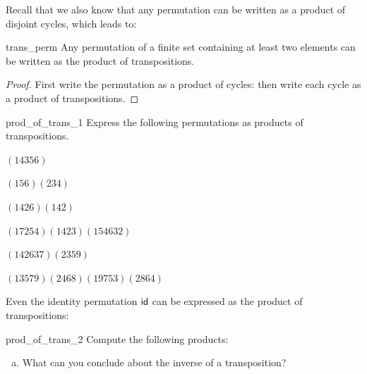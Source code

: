 \noindent
Recall that we also know that any permutation can be written as a product of disjoint cycles, which leads to:

\begin{prop}{trans_perm}
Any permutation of a finite set containing at least two elements can
be written as the product of transpositions. 
\end{prop}

\begin{proof} First write the permutation as a product of cycles: then write each cycle as a product of transpositions.
\end{proof}

\begin{exercise}{prod_of_trans_1}
Express the following permutations as products of transpositions. 

\begin{enumerate}[(a)]
\begin{multicols}{2}
 \item
$( 1 4 3 5 6 )$
\item
$( 1 5 6 )( 2 3 4 )$
 \item
$( 1 4 2 6 )( 1 4 2 )$
 \item
$( 1 7 2 5 4 )( 1 4 2 3 )( 1 5 4 6 3 2 )$
 \item
$( 1 4 2 6 3 7 )(2 3 5 9)$
\item
$( 1 3 5 7 9 )(2 4 6 8 ) (1 9 7 5 3) (2 8 6 4)$
\end{multicols}
\end{enumerate}

\end{exercise}

\noindent
Even the identity permutation ${\sf{i}d}$ can be expressed as the product of transpositions:

\begin{exercise}{prod_of_trans_2}
Compute the following products:
\begin{enumerate}[(a)]
\item
What can you conclude about the inverse of a transposition?
\end{enumerate}
\end{exercise}

